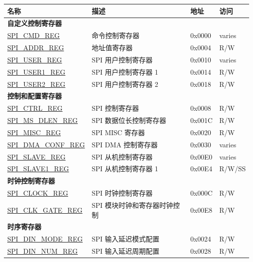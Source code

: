 

\begin{longtable}{ | p{5.5cm} | p{7.2cm} | p{1.3cm} | p{1.5cm} | }
\hline\rowcolor{lightgray}
\textbf{名称} & \textbf{描述} &  \textbf{地址} & \textbf{访问} \\ \hline
\endhead
\multicolumn{4}{|l|}{\textbf{自定义控制寄存器}} \\ \hline
\hyperref[regdesc:SPICMDREG]{SPI\_CMD\_REG} & 命令控制寄存器 & 0x0000 & varies \\ \hline
\hyperref[regdesc:SPIADDRREG]{SPI\_ADDR\_REG} & 地址值寄存器 & 0x0004 & R/W \\ \hline
\hyperref[regdesc:SPIUSERREG]{SPI\_USER\_REG} & SPI 用户控制寄存器 & 0x0010 & varies \\ \hline
\hyperref[regdesc:SPIUSER1REG]{SPI\_USER1\_REG} & SPI 用户控制寄存器 1 & 0x0014 & R/W \\ \hline
\hyperref[regdesc:SPIUSER2REG]{SPI\_USER2\_REG} & SPI 用户控制寄存器 2 & 0x0018 & R/W \\ \hline
\multicolumn{4}{|l|}{\textbf{控制和配置寄存器}} \\ \hline
\hyperref[regdesc:SPICTRLREG]{SPI\_CTRL\_REG} & SPI 控制寄存器 & 0x0008 & R/W \\ \hline
\hyperref[regdesc:SPIMSDLENREG]{SPI\_MS\_DLEN\_REG} & SPI 数据位长控制寄存器 & 0x001C & R/W \\ \hline
\hyperref[regdesc:SPIMISCREG]{SPI\_MISC\_REG} & SPI MISC 寄存器 & 0x0020 & R/W \\ \hline
\hyperref[regdesc:SPIDMACONFREG]{SPI\_DMA\_CONF\_REG} & SPI DMA 控制寄存器 & 0x0030 & varies \\ \hline
\hyperref[regdesc:SPISLAVEREG]{SPI\_SLAVE\_REG} & SPI 从机控制寄存器 & 0x00E0 & varies \\ \hline
\hyperref[regdesc:SPISLAVE1REG]{SPI\_SLAVE1\_REG} & SPI 从机控制寄存器 1 & 0x00E4 & R/W/SS \\ \hline
\multicolumn{4}{|l|}{\textbf{时钟控制寄存器}} \\ \hline
\hyperref[regdesc:SPICLOCKREG]{SPI\_CLOCK\_REG} & SPI 时钟控制寄存器 & 0x000C & R/W \\ \hline
\hyperref[regdesc:SPICLKGATEREG]{SPI\_CLK\_GATE\_REG} & SPI 模块时钟和寄存器时钟控制 & 0x00E8 & R/W \\ \hline
\multicolumn{4}{|l|}{\textbf{时序寄存器}} \\ \hline
\hyperref[regdesc:SPIDINMODEREG]{SPI\_DIN\_MODE\_REG} & SPI 输入延迟模式配置 & 0x0024 & R/W \\ \hline
\hyperref[regdesc:SPIDINNUMREG]{SPI\_DIN\_NUM\_REG} & SPI 输入延迟周期配置 & 0x0028 & R/W \\ \hline

\end{longtable}
